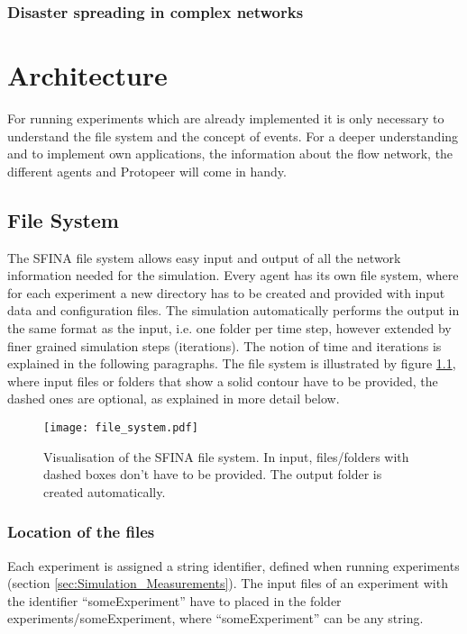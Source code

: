 \documentclass[11pt,fleqn]{book} %
\begin{document}
\subsection{Disaster spreading in complex networks}



\chapter{Architecture}
\label{ch:architecture}

For running experiments which are already implemented it is only necessary to understand the file system and the concept of events. For a deeper understanding and to implement own applications, the information about the flow network, the different agents and Protopeer will come in handy. 


\section{File System}\label{sec:file_system}
The SFINA file system allows easy input and output of all the network information needed for the simulation. Every agent has its own file system, where for each experiment a new directory has to be created and provided with input data and configuration files. The simulation automatically performs the output in the same format as the input, i.e. one folder per time step, however extended by finer grained simulation steps (iterations). The notion of time and iterations is explained in the following paragraphs. The file system is illustrated by figure \ref{fig:file_system}, where input files or folders that show a solid contour have to be provided, the dashed ones are optional, as explained in more detail below.

\begin{figure}[h]
\centering\texttt{[image: file\_system.pdf]}
\caption{Visualisation of the SFINA file system. In input, files/folders with dashed boxes don't have to be provided. The output folder is created automatically.}
\label{fig:file_system}
\end{figure}

\subsection{Location of the files}
Each experiment is assigned a string identifier, defined when running experiments (section \ref{sec:Simulation_Measurements}). The input files of an experiment with the identifier “someExperiment” have to placed in the folder experiments/someExperiment, where “someExperiment” can be any string.
\end{document}
